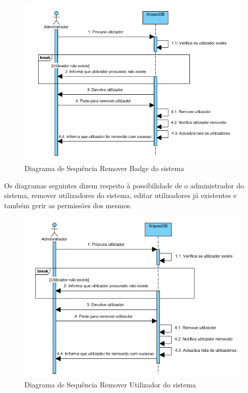 ﻿\documentclass[12pt,a4paper]{article}
\begin{document}
\begin{figure}[h!]
\centering
\includegraphics[scale=1]{sequencia/A_removerlocal}
\caption{Diagrama de Sequência Remover Badge do sistema} 
\end{figure}

\clearpage
Os diagramas seguintes dizem respeito à possibilidade de o administrador do sistema, remover utilizadores do sistema, editar utilizadores já existentes e também gerir as permissões dos mesmos.\\

\begin{figure}[h!]
\centering
\includegraphics[scale=1]{sequencia/A_removerutilizador}
\caption{Diagrama de Sequência Remover Utilizador do sistema} 
\end{figure}  
\end{document}
